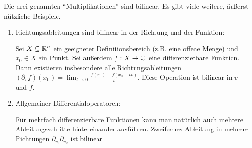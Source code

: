 \begin{example}
Die drei genannten \enquote{Multiplikationen} sind bilinear. Es gibt viele weitere, äußerst nützliche Beispiele.
\begin{enumerate}[resume]
	\item Richtungsableitungen sind bilinear in der Richtung und der Funktion:
	
	 Sei $X\subseteq\mathbb{R}^n$ ein geeigneter Definitionsbereich (z.B. eine offene Menge) und $x_0\in X$ ein Punkt. Sei außerdem $f:X \to\mathbb{C}$ eine differenzierbare Funktion. Dann existieren insbesondere alle Richtungsableitungen $(\partial_vf)(x_0) = \lim_{t\to 0} \frac{f(x_0)-f(x_0+tv)}{t}$. Diese Operation ist bilinear in $v$ und $f$.
     
     \item Allgemeiner Differentialoperatoren:
     
     Für mehrfach differenzierbare Funktionen kann man natürlich auch mehrere Ableitungsschritte hintereinander ausführen. Zweifaches Ableitung in mehrere Richtungen $\partial_{v_1} \partial_{v_2}$ ist bilinear 
\end{enumerate}
\end{example}


